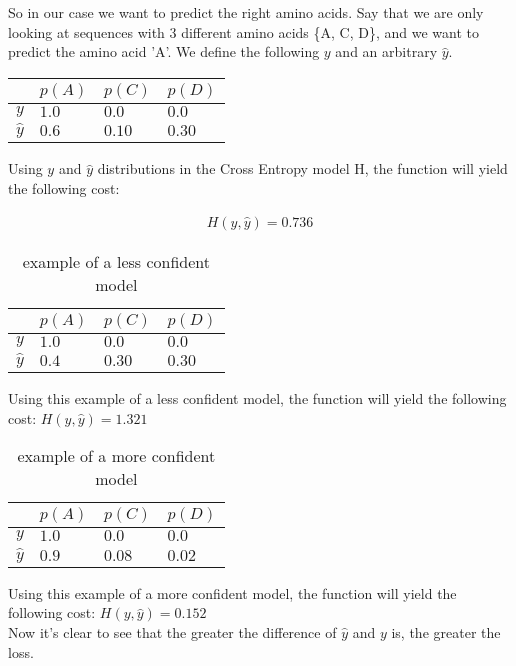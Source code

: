 \noindent
So in our case we want to predict the right amino acids. Say that we are only looking at sequences with 3 different amino acids \{A, C, D\}, and we want to predict the amino acid 'A'. We define the following $y$ and an arbitrary $\hat{y}$.

\begin{table}[h]
\centering
\begin{tabular}{|l|l|l|l|}
\hline
           & $p(A)$ & $p(C)$ & $p(D)$ \\ \hline
$y$       & $1.0$  & $0.0$  & $0.0 $ \\ \hline
$\hat{y}$ & $0.6$  & $0.10$ & $0.30$ \\ \hline
\end{tabular}
\end{table}

\noindent
Using $y$ and $\hat{y}$ distributions in the Cross Entropy model H, the function will yield the following cost:

\begin{align}
    H(y,\hat{y}) = 0.736
\end{align}

\begin{table}[h]
\centering
\begin{tabular}{|l|l|l|l|}
\hline
           & $p(A)$ & $p(C)$ & $p(D)$ \\ \hline
$y$       & $1.0$  & $0.0$  & $0.0 $ \\ \hline
$\hat{y}$ & $0.4$  & $0.30$ & $0.30$ \\ \hline
\end{tabular}
\caption{example of a less confident model}\label{Baseline:before}
\end{table}

\noindent
Using this example of a less confident model, the function will yield the following cost: $H(y,\hat{y}) = 1.321$\\

\begin{table}[h]
\centering
\begin{tabular}{|l|l|l|l|}
\hline
           & $p(A)$ & $p(C)$ & $p(D)$ \\ \hline
$y$       & $1.0$  & $0.0$  & $0.0 $ \\ \hline
$\hat{y}$ & $0.9$  & $0.08$ & $0.02$ \\ \hline
\end{tabular}
\caption{example of a more confident model}\label{Baseline:before}
\end{table}

\noindent
Using this example of a more confident model, the function will yield the following cost: $H(y,\hat{y}) = 0.152$\\

\noindent
Now it's clear to see that the greater the difference of $\hat{y}$ and $y$ is, the greater the loss.